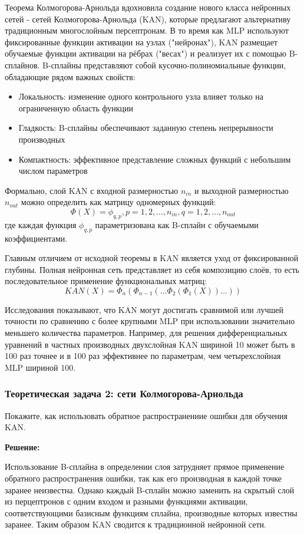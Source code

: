 Теорема Колмогорова-Арнольда вдохновила создание нового класса нейронных сетей - сетей Колмогорова-Арнольда (KAN), которые предлагают альтернативу традиционным многослойным персептронам. В то время как MLP используют фиксированные функции активации на узлах ("нейронах"), KAN размещает обучаемые функции активации на рёбрах ("весах") и реализует их с помощью B-сплайнов.
B-сплайны представляют собой кусочно-полиномиальные функции, обладающие рядом важных свойств:
\begin{itemize}
	\item Локальность: изменение одного контрольного узла влияет только на ограниченную область функции
	\item Гладкость: B-сплайны обеспечивают заданную степень непрерывности производных
	\item Компактность: эффективное представление сложных функций с небольшим числом параметров
\end{itemize}

Формально, слой KAN с входной размерностью $n_{in}$ и выходной размерностью $n_{out}$ можно определить как матрицу одномерных функций:
\[
	\Phi(X) = {\phi_{q,p}}, p = 1,2,\ldots,n_{in}, q = 1,2,\ldots,n_{out}
\]
где каждая функция $\phi_{q,p}$ параметризована как B-сплайн с обучаемыми коэффициентами.

Главным отличием от исходной теоремы в KAN является уход от фиксированной глубины. Полная нейронная сеть представляет из себя композицию слоёв, то есть последовательное применение функциональных матриц:
\[
	KAN(X) = \Phi_n(\Phi_{n - 1}( ...\Phi_2(\Phi_1(X))...))
\]

Исследования показывают, что KAN могут достигать сравнимой или лучшей точности по сравнению с более крупными MLP при использовании значительно меньшего количества параметров. Например, для решения дифференциальных уравнений в частных производных двухслойная KAN шириной 10 может быть в 100 раз точнее и в 100 раз эффективнее по параметрам, чем четырехслойная MLP шириной 100.

\subsubsection{Теоретическая задача 2: сети Колмогорова-Арнольда}
Покажите, как использовать обратное распространениие ошибки для обучения KAN.

\textbf{Решение:}

Использование B-сплайна в определении слоя затрудняет прямое применение обратного распространения ошибки, так как его производная в каждой точке заранее неизвестна. Однако каждый B-сплайн можно заменить на скрытый слой из перцептронов с одним входом и разными функциями активации, соответствующими базисным функциям сплайна, производные которых известны заранее. Таким образом KAN сводится к традиционной нейронной сети.

